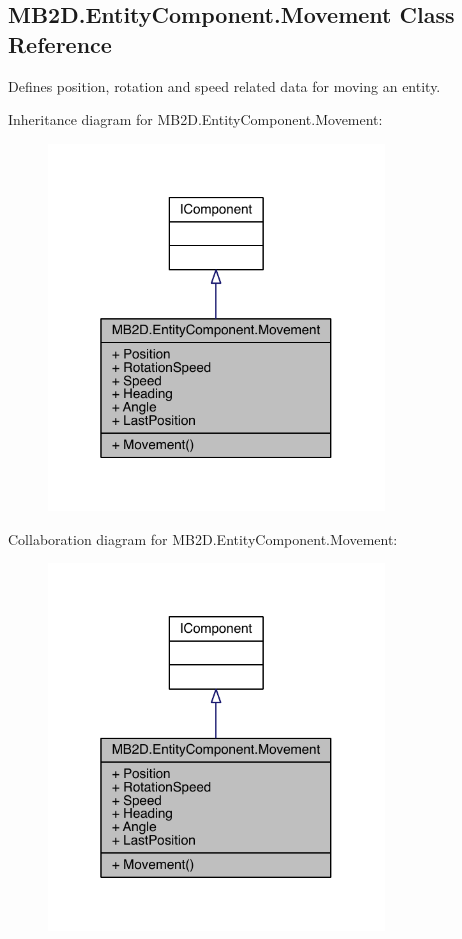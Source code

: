 \hypertarget{class_m_b2_d_1_1_entity_component_1_1_movement}{}\subsection{M\+B2\+D.\+Entity\+Component.\+Movement Class Reference}
\label{class_m_b2_d_1_1_entity_component_1_1_movement}


Defines position, rotation and speed related data for moving an entity.  




Inheritance diagram for M\+B2\+D.\+Entity\+Component.\+Movement\+:
\nopagebreak
\begin{figure}[H]
\begin{center}
\leavevmode
\includegraphics[width=253pt]{class_m_b2_d_1_1_entity_component_1_1_movement__inherit__graph}
\end{center}
\end{figure}


Collaboration diagram for M\+B2\+D.\+Entity\+Component.\+Movement\+:
\nopagebreak
\begin{figure}[H]
\begin{center}
\leavevmode
\includegraphics[width=253pt]{class_m_b2_d_1_1_entity_component_1_1_movement__coll__graph}
\end{center}
\end{figure}
